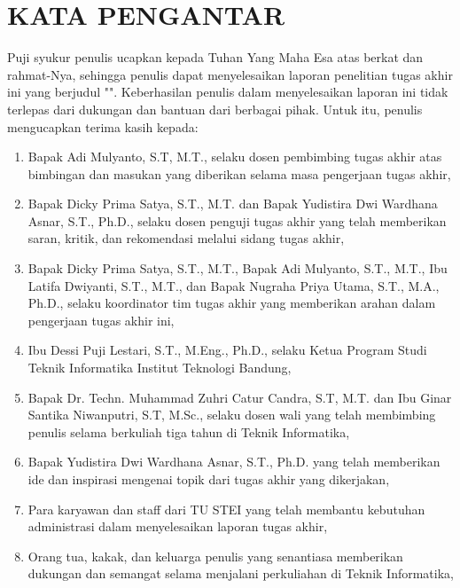 \chapter*{\MakeUppercase{Kata Pengantar}}

Puji syukur penulis ucapkan kepada Tuhan Yang Maha Esa atas berkat dan rahmat-Nya, sehingga penulis dapat menyelesaikan laporan penelitian tugas akhir ini yang berjudul "{\thetitle}". Keberhasilan penulis dalam menyelesaikan laporan ini tidak terlepas dari dukungan dan bantuan dari berbagai pihak. Untuk itu, penulis mengucapkan terima kasih kepada:

\begin{enumerate}
  \item Bapak Adi Mulyanto, S.T, M.T., selaku dosen pembimbing tugas akhir atas bimbingan dan masukan yang diberikan selama masa pengerjaan tugas akhir,
   
  \item Bapak Dicky Prima Satya, S.T., M.T. dan Bapak Yudistira Dwi Wardhana Asnar, S.T., Ph.D., selaku dosen penguji tugas akhir yang telah memberikan saran, kritik, dan rekomendasi melalui sidang tugas akhir,
   
  \item Bapak Dicky Prima Satya, S.T., M.T., Bapak Adi Mulyanto, S.T., M.T., Ibu Latifa Dwiyanti, S.T., M.T., dan Bapak Nugraha Priya Utama, S.T., M.A., Ph.D., selaku koordinator tim tugas akhir yang memberikan arahan dalam pengerjaan tugas akhir ini,

  \item Ibu Dessi Puji Lestari, S.T., M.Eng., Ph.D., selaku Ketua Program Studi Teknik Informatika Institut Teknologi Bandung,
   
  \item Bapak Dr. Techn. Muhammad Zuhri Catur Candra, S.T, M.T. dan Ibu Ginar Santika Niwanputri, S.T, M.Sc., selaku dosen wali yang telah membimbing penulis selama berkuliah tiga tahun di Teknik Informatika,
  
  \item Bapak Yudistira Dwi Wardhana Asnar, S.T., Ph.D. yang telah memberikan ide dan inspirasi mengenai topik dari tugas akhir yang dikerjakan, 
  
  \item Para karyawan dan staff dari TU STEI yang telah membantu kebutuhan administrasi dalam menyelesaikan laporan tugas akhir,
  
  \item Orang tua, kakak, dan keluarga penulis yang senantiasa memberikan dukungan dan semangat selama menjalani perkuliahan di Teknik Informatika,


\end{enumerate}
